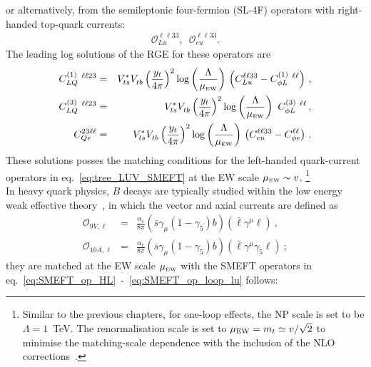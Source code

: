 or alternatively, from the semileptonic four-fermion (SL-4F) operators with right-handed top-quark currents:
\begin{eqnarray} 
	\label{eq:SMEFT_op_loop_lu}
	\mathcal{O}_{Lu}^{\ell \ell 3 3}, \,	\,\,	\mathcal{O}_{eu}^{\ell \ell 3 3} .
\end{eqnarray}
The leading log solutions of the RGE for these operators are~\cite{Jenkins:2013zja,Jenkins:2013wua}
\begin{eqnarray}
	\label{eq:SMEFT_matching_1loop}
	C_{LQ}^{(1)}\ ^{\ell \ell 23} &=& V_{ts}^{*} V^{ }_{tb} \left(\frac{y_{t} }{4 \pi}\right)^2 \log \left( \frac{\Lambda}{\mu_{\textrm{\tiny{EW}}}} \right)   \, \left(C_{Lu}^{\ell \ell 3 3} - C_{\phi L}^{(1)}\ ^{\ell \ell} \right)\,,\nonumber \\
	C_{LQ}^{(3)}\ ^{\ell \ell 23} &=& V_{ts}^{*} V^{ }_{tb} \left(\frac{y_{t} }{4 \pi}\right)^2 \log \left( \frac{\Lambda}{\mu_{\textrm{\tiny{EW}}}} \right)  \ C_{\phi L}^{(3)}\ ^{\ell \ell}  \,,\nonumber \\
	C_{Qe}^{23\ell \ell} &=& V_{ts}^{*} V^{ }_{tb} \left(\frac{y_{t} }{4 \pi}\right)^2 \log \left( \frac{\Lambda}{\mu_{\textrm{\tiny{EW}}}} \right)   \, \left( C_{eu}^{\ell \ell 3 3} - C^{\ell \ell}_{\phi e}\right) \, .
\end{eqnarray}
 These solutions posses the matching conditions for the left-handed quark-current operators in eq.~\eqref{eq:tree_LUV_SMEFT} at the EW scale $\mu_{\textrm{\tiny{EW}}}\sim v$. \footnote{Similar to the previous chapters, for one-loop effects,  the NP scale is set to be $\Lambda = 1$~TeV.  The renormalisation scale is set to $\mu_{\rm EW} = m_t\simeq v/\sqrt{2}$ to minimise the matching-scale dependence with the inclusion of the NLO corrections~\cite{Aebischer:2015fzz,Bobeth:2017xry}.}\\
In heavy quark physics, $B$ decays are typically studied within the low energy weak effective theory~\cite{Buchalla:1995vs,Buras:1998raa,Silvestrini:2019sey}, in which the vector and axial currents are defined as
\begin{eqnarray}
	\label{eq:_Q9_Q10}
	\mathcal{O}_{9 V, \ell} & = & \frac{\alpha_{e}}{8 \pi} (\bar{s} \gamma_{\mu} (1-\gamma_{5})b) ( \bar{\ell} \gamma^{\mu} \ell ) \nonumber \ , \ \\
	\mathcal{O}_{10 A, \ell} & = & \frac{\alpha_{e}}{8 \pi} (\bar{s} \gamma_{\mu} (1-\gamma_{5})b) ( \bar{\ell} \gamma^{\mu} \gamma_{5} \ell ) \ ;
\end{eqnarray}
 they are matched at the EW scale $\mu_{\textrm{\tiny{EW}}}$  with the SMEFT operators in  eq.~\eqref{eq:SMEFT_op_HL}~-~\eqref{eq:SMEFT_op_loop_lu} follows:
